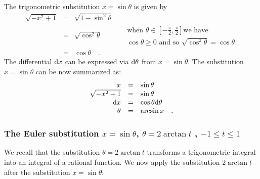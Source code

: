 \documentclass[12pt]{book}
\begin{document}
The trigonometric substitution $x=\sin \theta$ is given by
\[
\begin{array}{rcll|l}
\displaystyle \sqrt{-x^2+1}&=&\displaystyle \sqrt{1-\sin^2\theta}\\
&=&\displaystyle \sqrt{\cos^2\theta} &&\begin{array}{l} \text{when }\theta\in\left[-\frac{\pi}{2}, \frac{\pi}{2} \right] \text{we have}\\
\cos \theta\geq 0 \text{ and so } \sqrt{\cos^2\theta}=\cos \theta
\end{array} \\
&=&\displaystyle \cos \theta\quad .
\end{array}
\]
The differential ${\normalfont \text{d}} x$ can be expressed via ${\normalfont \text{d}} \theta$ from $x=\sin \theta$. The substitution $x=\sin \theta $ can be now summarized as:
\begin{equation*}
\begin{array}{rcl}
x&=&\sin \theta\\
\sqrt{-x^2+1}&=&\sin \theta\\
{\normalfont \text{d}} x&=& \cos \theta {\normalfont \text{d}} \theta\\
\theta&=&\arcsin x \quad .
\end{array}
\end{equation*}
\subsubsection{The Euler substitution $x=\sin \theta$, $\theta=2\arctan t$ , $-1\leq t\leq 1$}
We recall that the substitution $\theta = 2\arctan t$ transforms a trigonometric integral into an integral of a rational function. We now apply the substitution $2\arctan t$ after the substitution $x=\sin \theta$:
\end{document}
